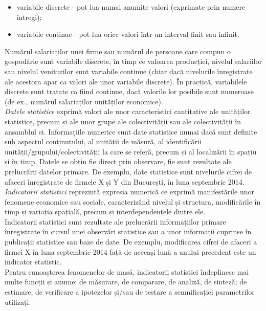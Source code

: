 \documentclass[
  11pt,
  b5paper,
  nottoc]{book}
\providecommand{\tightlist}{%
  \setlength{\itemsep}{0pt}\setlength{\parskip}{0pt}}\usepackage{longtable,booktabs,array}
\begin{document}
\begin{itemize}
\tightlist
\item
  variabile discrete - pot lua numai anumite valori (exprimate prin
  numere întregi);
\item
  variabile continue - pot lua orice valori într-un interval finit sau
  infinit.
\end{itemize}

Numărul salariaților unei firme sau numărul de persoane care compun o
gospodărie sunt variabile discrete, în timp ce valoarea producției,
nivelul salariilor sau nivelul veniturilor sunt variabile continue
(chiar dacă nivelurile înregistrate ale acestora apar ca valori ale unor
variabile discrete). În practică, variabilele discrete sunt tratate ca
fiind continue, dacă valorile lor posibile sunt numeroase (de ex.,
numărul salariaților unităților economice).\\
\emph{Datele statistice} exprimă valori ale unor caracteristici
cantitative ale unităților statistice, precum și ale unor grupe ale
colectivității sau ale colectivității în ansamblul ei. Informațiile
numerice sunt date statistice numai dacă sunt definite sub aspectul
conținutului, al unității de măsură, al identificării
unității/grupului/colectivității la care se referă, precum și al
localizării în spațiu și în timp. Datele se obțin fie direct prin
observare, fie sunt rezultate ale prelucrării datelor primare. De
exemplu, date statistice sunt nivelurile cifrei de afaceri înregistrate
de firmele X și Y din București, în luna septembrie 2014.\\
\emph{Indicatorii statistici} reprezintă expresia numerică ce exprimă
manifestările unor fenomene economice sau sociale, caracterizând nivelul
și structura, modificările în timp și variația spațială, precum și
interdependențele dintre ele.\\
Indicatorii statistici sunt rezultate ale prelucrării informațiilor
primare înregistrate în cursul unei observări statistice sau a unor
informații cuprinse în publicații statistice sau baze de date. De
exemplu, modificarea cifrei de afaceri a firmei X în luna septembrie
2014 față de aceeași lună a anului precedent este un indicator
statistic.\\
Pentru cunoașterea fenomenelor de masă, indicatorii statistici
îndeplinesc mai multe funcții și anume: de măsurare, de comparare, de
analiză, de sinteză; de estimare, de verificare a ipotezelor și/sau de
testare a semnificației parametrilor utilizați.\\
\end{document}

